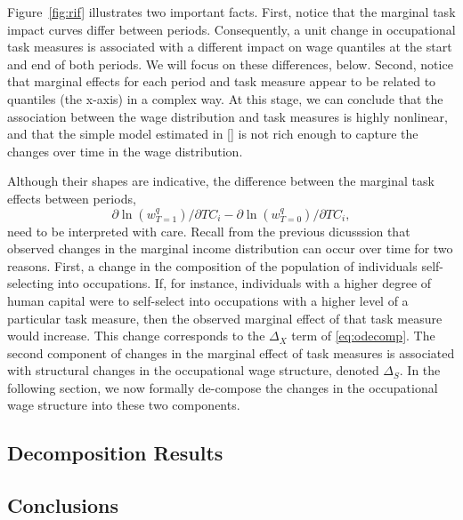 Figure~\ref{fig:rif} illustrates two important facts. First, notice that the marginal task impact curves differ between periods. Consequently, a unit change in occupational task measures is associated with a different impact on wage quantiles at the start and end of both periods. We will focus on these differences, below. Second, notice that marginal effects for each period and task measure appear to be related to quantiles (the x-axis) in a complex way. At this stage, we can conclude that the association between the wage distribution and task measures is highly nonlinear, and that the simple model estimated in \eqref{} is not rich enough to capture the changes over time in the wage distribution.


Although their shapes are indicative, the difference between the marginal task effects between periods,
$$\partial\ln(w^q_{T=1})/\partial TC_i-\partial\ln(w^q_{T=0})/\partial TC_i,$$
need to be interpreted with care. Recall from the previous dicusssion that observed changes in the marginal income distribution can occur over time for two reasons. First, a change in the composition of the population of individuals self-selecting into occupations. If, for instance, individuals with a higher degree of human capital were to self-select into occupations with a higher level of a particular task measure, then the observed marginal effect of that task measure would increase. This change corresponds to the $\Delta_X$ term of \eqref{eq:odecomp}. The second component of changes in the marginal effect of task measures is associated with structural changes in the occupational wage structure, denoted $\Delta_S$. In the following section, we now formally de-compose the changes in the occupational wage structure into these two components.

\subsection{Decomposition Results}

\subsection{Conclusions}

